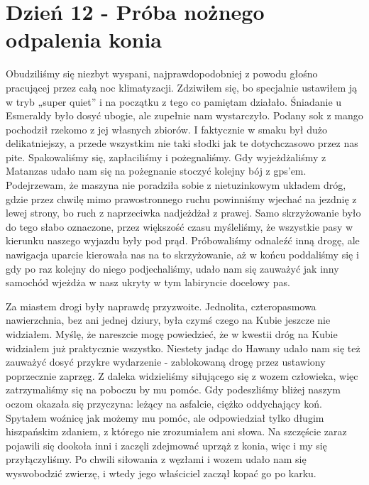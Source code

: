 
\chapter[Próba nożnego odpalenia konia]{Dzień 12 - Próba nożnego odpalenia konia}

Obudziliśmy się niezbyt wyspani, najprawdopodobniej z powodu głośno pracującej przez całą noc klimatyzacji.
Zdziwiłem się, bo specjalnie ustawiłem ją w tryb „super quiet” i na początku z tego co pamiętam działało.
Śniadanie u Esmeraldy było dosyć ubogie, ale zupełnie nam wystarczyło.
Podany sok z mango pochodził rzekomo z jej własnych zbiorów.
I faktycznie w smaku był dużo delikatniejszy, a przede wszystkim nie taki słodki jak te dotychczasowo przez nas pite.
Spakowaliśmy się, zapłaciliśmy i pożegnaliśmy.
Gdy wyjeżdżaliśmy z Matanzas udało nam się na pożegnanie stoczyć kolejny bój z gps’em.
Podejrzewam, że maszyna nie poradziła sobie z nietuzinkowym układem dróg, gdzie przez chwilę mimo prawostronnego ruchu powinniśmy wjechać na jezdnię z lewej strony, bo ruch z naprzeciwka nadjeżdżał z prawej.
Samo skrzyżowanie było do tego słabo oznaczone, przez większość czasu myśleliśmy, że wszystkie pasy w kierunku naszego wyjazdu były pod prąd.
Próbowaliśmy odnaleźć inną drogę, ale nawigacja uparcie kierowała nas na to skrzyżowanie, aż w końcu poddaliśmy się i gdy po raz kolejny do niego podjechaliśmy, udało nam się zauważyć jak inny samochód wjeżdża w nasz ukryty w tym labiryncie docelowy pas.
\par Za miastem drogi były naprawdę przyzwoite.
Jednolita, czteropasmowa nawierzchnia, bez ani jednej dziury, była czymś czego na Kubie jeszcze nie widziałem.
Myślę, że nareszcie mogę powiedzieć, że w kwestii dróg na Kubie widziałem już praktycznie wszystko.
Niestety jadąc do Hawany udało nam się też zauważyć dosyć przykre wydarzenie - zablokowaną drogę przez ustawiony poprzecznie zaprzęg.
Z daleka widzieliśmy siłującego się z wozem człowieka, więc zatrzymaliśmy się na poboczu by mu pomóc.
Gdy podeszliśmy bliżej naszym oczom okazała się przyczyna: leżący na asfalcie, ciężko oddychający koń.
Spytałem woźnicę jak możemy mu pomóc, ale odpowiedział tylko długim hiszpańskim zdaniem, z którego nie zrozumiałem ani słowa.
Na szczęście zaraz pojawili się dookoła inni i zaczęli zdejmować uprząż z konia, więc i my się przyłączyliśmy.
Po chwili siłowania z węzłami i wozem udało nam się wyswobodzić zwierzę, i wtedy jego właściciel zaczął kopać go po karku.


